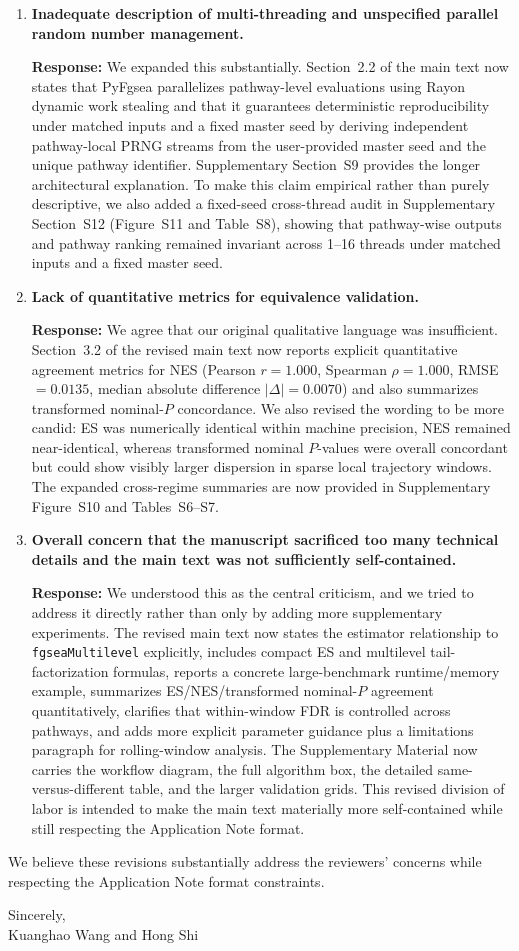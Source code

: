 \documentclass[11pt]{article}
\begin{document}
\begin{enumerate}[leftmargin=1.5em]
\item \textbf{Inadequate description of multi-threading and unspecified parallel random number management.}

\textbf{Response:} We expanded this substantially. Section~2.2 of the main text now states that PyFgsea parallelizes pathway-level evaluations using Rayon dynamic work stealing and that it guarantees deterministic reproducibility under matched inputs and a fixed master seed by deriving independent pathway-local PRNG streams from the user-provided master seed and the unique pathway identifier. Supplementary Section~S9 provides the longer architectural explanation. To make this claim empirical rather than purely descriptive, we also added a fixed-seed cross-thread audit in Supplementary Section~S12 (Figure~S11 and Table~S8), showing that pathway-wise outputs and pathway ranking remained invariant across 1--16 threads under matched inputs and a fixed master seed.

\item \textbf{Lack of quantitative metrics for equivalence validation.}

\textbf{Response:} We agree that our original qualitative language was insufficient. Section~3.2 of the revised main text now reports explicit quantitative agreement metrics for NES (Pearson $r=1.000$, Spearman $\rho=1.000$, RMSE $=0.0135$, median absolute difference $|\Delta|=0.0070$) and also summarizes transformed nominal-$P$ concordance. We also revised the wording to be more candid: ES was numerically identical within machine precision, NES remained near-identical, whereas transformed nominal $P$-values were overall concordant but could show visibly larger dispersion in sparse local trajectory windows. The expanded cross-regime summaries are now provided in Supplementary Figure~S10 and Tables~S6--S7.

\item \textbf{Overall concern that the manuscript sacrificed too many technical details and the main text was not sufficiently self-contained.}

\textbf{Response:} We understood this as the central criticism, and we tried to address it directly rather than only by adding more supplementary experiments. The revised main text now states the estimator relationship to \texttt{fgseaMultilevel} explicitly, includes compact ES and multilevel tail-factorization formulas, reports a concrete large-benchmark runtime/memory example, summarizes ES/NES/transformed nominal-$P$ agreement quantitatively, clarifies that within-window FDR is controlled across pathways, and adds more explicit parameter guidance plus a limitations paragraph for rolling-window analysis. The Supplementary Material now carries the workflow diagram, the full algorithm box, the detailed same-versus-different table, and the larger validation grids. This revised division of labor is intended to make the main text materially more self-contained while still respecting the Application Note format.
\end{enumerate}

We believe these revisions substantially address the reviewers' concerns while respecting the Application Note format constraints.

\vspace{1em}

Sincerely,\\
Kuanghao Wang and Hong Shi
\end{document}
